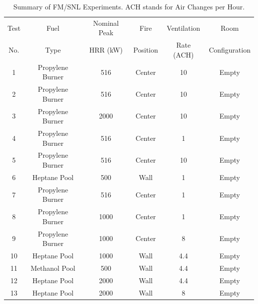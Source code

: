 \begin{table}[!ht]
\caption[Summary of FM/SNL Experiments]{Summary of FM/SNL Experiments. ACH stands for Air Changes per Hour.}
\begin{center}
\begin{tabular}{|c|c|c|c|c|c|}
\hline
Test    &  Fuel             & Nominal Peak  & Fire          & Ventilation       & Room                   \\
No.     &  Type             & HRR (kW)      & Position      & Rate (ACH)        & Configuration          \\ \hline \hline
1       & Propylene Burner  &     516       & Center        & 10                & Empty                  \\ \hline
2       & Propylene Burner  &     516       & Center        & 10                & Empty                  \\ \hline
3       & Propylene Burner  &    2000       & Center        & 10                & Empty                  \\ \hline
4       & Propylene Burner  &     516       & Center        & 1                 & Empty                  \\ \hline
5       & Propylene Burner  &     516       & Center        & 10                & Empty                  \\ \hline
6       & Heptane Pool      &     500       & Wall          & 1                 & Empty                  \\ \hline
7       & Propylene Burner  &     516       & Center        & 1                 & Empty                  \\ \hline
8       & Propylene Burner  &    1000       & Center        & 1                 & Empty                  \\ \hline
9       & Propylene Burner  &    1000       & Center        & 8                 & Empty                  \\ \hline
10      & Heptane Pool      &    1000       & Wall          & 4.4               & Empty                  \\ \hline
11      & Methanol Pool     &     500       & Wall          & 4.4               & Empty                  \\ \hline
12      & Heptane Pool      &    2000       & Wall          & 4.4               & Empty                  \\ \hline
13      & Heptane Pool      &    2000       & Wall          & 8                 & Empty                  \\ \hline

\end{tabular}
\end{center}
\end{table}
